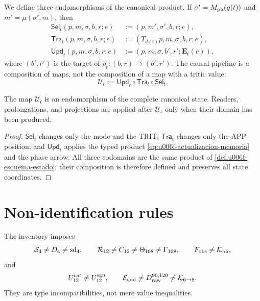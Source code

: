 We define three endomorphisms of the canonical product. If
\(\sigma'=M_{\rm ph}(g(t))\) and \(m'=\mu(\sigma',m)\), then
\begin{align}
 \mathsf{Sel}_t(p,m,\sigma,b,r;e)
  &:=(p,m',\sigma',b,r;e),\label{eq:u006f-selector-tipado}\\
 \mathsf{Tra}_t(p,m,\sigma,b,r;e)
  &:=(T_{d(t)}p,m,\sigma,b,r;e),\label{eq:u006f-transporte-tipado}\\
 \mathsf{Upd}_t(p,m,\sigma,b,r;e)
  &:=(p,m,\sigma,b',r';\mathbf E_t(e)),
 \label{eq:u006f-memoria-tipada}
\end{align}
where \((b',r')\) is the target of \(\rho_t:(b,r)\to(b',r')\). The causal pipeline is a composition of maps, not the composition of a map with a tritic value:
\begin{equation}
 \boxed{\mathcal U_t:=
 \mathsf{Upd}_t\circ\mathsf{Tra}_t\circ\mathsf{Sel}_t.}
 \label{eq:u006f-tuberia}
\end{equation}

\begin{theorem}
\label{thm:u006f-cierre-tuberia}
The map \(\mathcal U_t\) is an endomorphism of the complete canonical
state. Readers, prolongations, and projections are applied after
\(\mathcal U_t\) only when their domain has been produced.
\end{theorem}

\begin{proof}
\(\mathsf{Sel}_t\) changes only the mode and the TRIT;
\(\mathsf{Tra}_t\) changes only the APP position; and \(\mathsf{Upd}_t\) applies the
typed product \eqref{eq:u006f-actualizacion-memoria} and the phase arrow. All three codomains are the
same product of \cref{def:u006f-esquema-estado}; their composition is therefore defined and
preserves all state coordinates.
\end{proof}

\section{Non-identification rules}

The inventory imposes
\begin{equation}
 \mathcal S_4\neq D_4\neq\operatorname{sd}_4,
 \qquad
 \mathcal R_{12}\neq C_{12}\neq\Theta_{108}\neq\Gamma_{108},
 \qquad
 F_{\rm obs}\neq\mathcal K_{\rm ph},
 \label{eq:u006f-no-identificacion-uno}
\end{equation}
and
\begin{equation}
 U_{12}^{\rm cat}\neq U_{12}^{\rm sgn},
 \qquad
 \mathcal E_{\rm dod}\neq D_{\rm raw}^{90,120}
 \neq\mathcal K_{6\to8}.
 \label{eq:u006f-no-identificacion-dos}
\end{equation}
They are type incompatibilities, not mere value inequalities.


